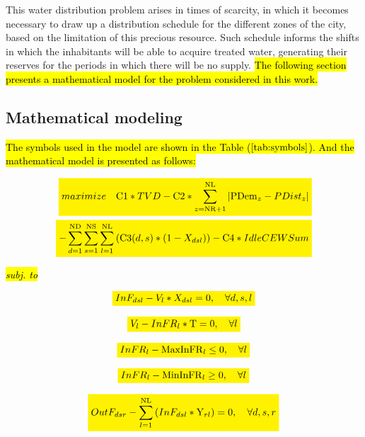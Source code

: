 \documentclass{singlecol}
\newcommand{\mathcolorbox}[2]{\colorbox{#1}{$\displaystyle #2$}}
\theoremstyle{TH}{
\newtheorem{lemma}{Lemma}
\newtheorem{theorem}[lemma]{Theorem}
\newtheorem{corrolary}[lemma]{Corrolary}
\newtheorem{conjecture}[lemma]{Conjecture}
\newtheorem{proposition}[lemma]{Proposition}
\newtheorem{claim}[lemma]{Claim}
\newtheorem{stheorem}[lemma]{Wrong Theorem}
\newtheorem{algorithm}{Algorithm}
}
\theoremstyle{THrm}{
\newtheorem{definition}{Definition}[section]
\newtheorem{question}{Question}[section]
\newtheorem{remark}{Remark}
\newtheorem{scheme}{Scheme}
}
\theoremstyle{THhit}{
\newtheorem{case}{Case}[section]
}
\begin{document}
This water distribution problem arises in times of scarcity, in which it becomes necessary to draw up a distribution schedule for the different zones of the city, based on the limitation of this precious resource. Such schedule informs the shifts in which the inhabitants will be able to acquire treated water, generating their reserves for the periods in which there will be no supply. \hl{The following section presents a mathematical model for the problem considered in this work. }

\subsection{Mathematical modeling}
\label{sec:problemModel}
 
\hl{The symbols used in the model are shown in the Table (}\mathcolorbox{yellow}{\ref{tab:symbols}}\hl{). And the mathematical model is presented as follows:}

\begin{eqnarray} 
\label{eq:objFunc}
	 \mathcolorbox{yellow}{maximize \quad \mathrm{C1}*TVD - \mathrm{C2}*\sum_{z=\mathrm{NR}+1}^{\mathrm{NL}}{|\mathrm{PDem}_{z} - PDist_{z}|}} \\ \nonumber 
	\mathcolorbox{yellow}{- \sum_{d=1}^{\mathrm{ND}}{\sum_{s=1}^{\mathrm{NS}}{\sum_{l=1}^{\mathrm{NL}}{(\mathrm{C3}(d,s)*(1-X_{dsl}))}}} - \mathrm{C4}*IdleCEWSum}
\end{eqnarray}

\hl{\emph{subj. to}}

\begin{equation}
	\mathcolorbox{yellow}{InF_{dsl} - V_{l} * X_{dsl} = 0, \quad \forall{d, s, l}}
	\label{eq:evalInF}
\end{equation}

\begin{equation}
	\mathcolorbox{yellow}{V_l - {InFR}_l * \mathrm{T} = 0, \quad \forall{l}}
	\label{eq:evalnFR}
\end{equation}

\begin{equation}
	\mathcolorbox{yellow}{{InFR}_l - \mathrm{MaxInFR}_{l} \leq 0, \quad \forall{l}}
	\label{eq:evalMaxInfR}
\end{equation} 

\begin{equation}
	\mathcolorbox{yellow}{{InFR}_l - \mathrm{MinInFR}_{l} \geq 0, \quad \forall{l}}
	\label{eq:evalMinInfR}
\end{equation}

\begin{equation} 
	\mathcolorbox{yellow}{OutF_{dsr} - \sum_{l=1}^{\mathrm{NL}}{(InF_{dsl}*\mathrm{Y}_{rl})} = 0, \quad \forall{d, s, r}}
	 \label{eq:evalOutFRes}
\end{equation}
\end{document}
